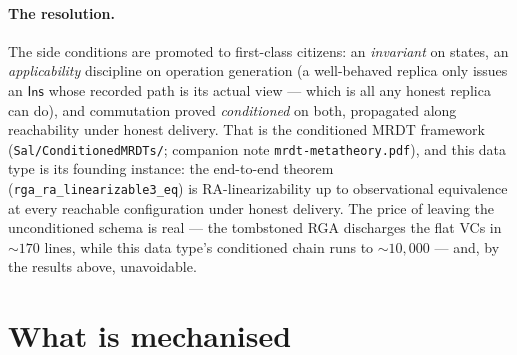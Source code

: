 \documentclass[11pt]{article}
\newcommand{\Ins}{\mathsf{Ins}}
\begin{document}
\paragraph{The resolution.} The side conditions are promoted to first-class
citizens: an \emph{invariant} on states, an \emph{applicability} discipline on
operation generation (a well-behaved replica only issues an $\Ins$ whose
recorded path is its actual view --- which is all any honest replica can do),
and commutation proved \emph{conditioned} on both, propagated along
reachability under honest delivery. That is the conditioned MRDT framework
(\texttt{Sal/ConditionedMRDTs/}; companion note
\texttt{mrdt-metatheory.pdf}), and this data type is its founding instance:
the end-to-end theorem
(\texttt{rga\_ra\_linearizable3\_eq}) is RA-linearizability up
to observational equivalence at every reachable configuration under honest
delivery. The price of leaving the unconditioned schema is real --- the
tombstoned RGA discharges the flat VCs in ${\sim}170$ lines, while this data
type's conditioned chain runs to ${\sim}10{,}000$ --- and, by the results
above, unavoidable.

\section{What is mechanised}
\label{sec:mech}
\end{document}
